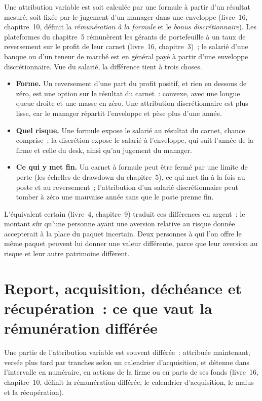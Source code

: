 Une attribution variable est soit calculée par une formule à partir d'un résultat mesuré, soit fixée par le jugement d'un manager dans une enveloppe
(livre~16, chapitre~10, définit la \emph{rémunération à la formule} et le \emph{bonus discrétionnaire}). Les plateformes
du chapitre~5 rémunèrent les gérants de portefeuille à un taux de reversement sur le profit de leur carnet (livre~16, chapitre~3)~; le salarié d'une banque ou
d'un teneur de marché est en général payé à partir d'une enveloppe discrétionnaire. Vue du salarié, la différence tient à trois choses.
\begin{itemize}
\item \textbf{Forme.} Un reversement d'une part du profit positif, et rien en dessous de zéro, est une option sur le résultat du carnet~:
convexe, avec une longue queue droite et une masse en zéro. Une attribution discrétionnaire est plus lisse, car le manager répartit l'enveloppe et
pèse plus d'une année.
\item \textbf{Quel risque.} Une formule expose le salarié au résultat du carnet, chance comprise~; la discrétion expose le
salarié à l'enveloppe, qui suit l'année de la firme et celle du desk, ainsi qu'au jugement du manager.
\item \textbf{Ce qui y met fin.} Un carnet à formule peut être fermé par une limite de perte (les échelles de drawdown du chapitre~5), ce qui met fin à la fois au
poste et au reversement~; l'attribution d'un salarié discrétionnaire peut tomber à zéro une mauvaise année sans que le poste prenne fin.
\end{itemize}
L'équivalent certain (livre~4, chapitre~9) traduit ces différences en argent~: le montant sûr qu'une personne
ayant une aversion relative au risque donnée accepterait à la place du paquet incertain. Deux personnes à qui l'on offre le même paquet peuvent
lui donner une valeur différente, parce que leur aversion au risque et leur autre patrimoine diffèrent.

\section{Report, acquisition, déchéance et récupération~: ce que vaut la rémunération différée}

Une partie de l'attribution variable est souvent différée~: attribuée maintenant, versée plus tard par tranches selon un calendrier d'acquisition, et détenue
dans l'intervalle en numéraire, en actions de la firme ou en parts de ses fonds (livre~16, chapitre~10, définit la rémunération différée,
le calendrier d'acquisition, le malus et la récupération).

